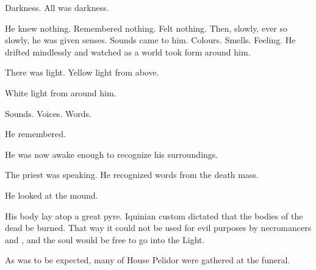 
\begin{comment}
\section{The Funeral}
\end{comment}

Darkness. 
All was darkness. 

He knew nothing. 
Remembered nothing. 
Felt nothing. 
Then, slowly, ever so slowly, he was given senses. 
Sounds came to him. 
Colours. 
Smells. 
Feeling. 
He drifted mindlessly and watched as a world took form around him. 

There was light. 
Yellow light from above. 


White light from around him. 


Sounds. 
Voices. 
Words. 


He remembered. 


He was now awake enough to recognize his surroundings. 

%
%
% 
%

The priest was speaking. 
He recognized words from the \iquinian{} death mass. 

He looked at the mound. 

His body lay atop a great pyre. 
Iquinian custom dictated that the bodies of the dead be burned. 
That way it could not be used for evil purposes by necromancers and \daemons, and the soul would be free to go into the Light. 


As was to be expected, many of House Pelidor were gathered at the funeral. 

